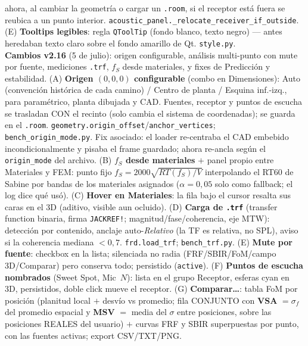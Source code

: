 \documentclass[11pt, a4paper]{article}
\begin{document}
\begin{center}
{    ahora, al cambiar la geometría o cargar un \texttt{.room}, si el receptor
    está fuera se reubica a un punto interior.
    \texttt{acoustic\_panel.\_relocate\_receiver\_if\_outside}.
    (E) \textbf{Tooltips legibles}: regla \texttt{QToolTip} (fondo blanco,
    texto negro) --- antes heredaban texto claro sobre el fondo amarillo de Qt.
    \texttt{style.py}.\\[2pt]
    \textbf{Cambios v2.16} (5 de julio): origen configurable, análisis
    multi-punto con mute por fuente, mediciones \texttt{.trf}, $f_S$ desde
    materiales, y fixes de Predicción y estabilidad.
    (A) \textbf{Origen $(0,0,0)$ configurable} (combo en Dimensiones): Auto
    (convención histórica de cada camino) / Centro de planta / Esquina
    inf.-izq., para paramétrico, planta dibujada y CAD. Fuentes, receptor y
    puntos de escucha se trasladan CON el recinto (solo cambia el sistema de
    coordenadas); se guarda en el \texttt{.room}.
    \texttt{geometry.origin\_offset}/\texttt{anchor\_vertices};
    \texttt{bench\_origin\_mode.py}. Fix asociado: el loader re-centraba el
    CAD embebido incondicionalmente y pisaba el frame guardado; ahora re-ancla
    según el \texttt{origin\_mode} del archivo.
    (B) \textbf{$f_S$ desde materiales} $+$ panel propio entre Materiales y
    FEM: punto fijo $f_S = 2000\sqrt{RT(f_S)/V}$ interpolando el RT60 de
    Sabine por bandas de los materiales asignados ($\alpha{=}0{,}05$ solo como
    fallback; el log dice qué usó).
    (C) \textbf{Hover en Materiales}: la fila bajo el cursor resalta sus caras
    en el 3D (aditivo, visible aun ocluido).
    (D) \textbf{Carga de \texttt{.trf}} (transfer function binaria, firma
    \texttt{JACKREF!}; magnitud/fase/coherencia, eje MTW): detección por
    contenido, anclaje auto-\emph{Relativo} (la TF es relativa, no SPL), aviso
    si la coherencia mediana $<0{,}7$. \texttt{frd.load\_trf};
    \texttt{bench\_trf.py}.
    (E) \textbf{Mute por fuente}: checkbox en la lista; silenciada no radia
    (FRF/SBIR/FoM/campo 3D/Comparar) pero conserva todo; persistido
    (\texttt{active}).
    (F) \textbf{Puntos de escucha nombrados} (Sweet Spot, Mic~$N$): lista en
    el grupo Receptor, esferas cyan en 3D, persistidos, doble click mueve el
    receptor.
    (G) \textbf{Comparar\ldots}: tabla FoM por posición (planitud local $+$
    desvío vs promedio; fila CONJUNTO con \textbf{VSA} $=\sigma_f$ del
    promedio espacial y \textbf{MSV} $=$ media del $\sigma$ entre posiciones,
    sobre las posiciones REALES del usuario) $+$ curvas FRF y SBIR
    superpuestas por punto, con las fuentes activas; export CSV/TXT/PNG.
}
\end{center}
\end{document}
